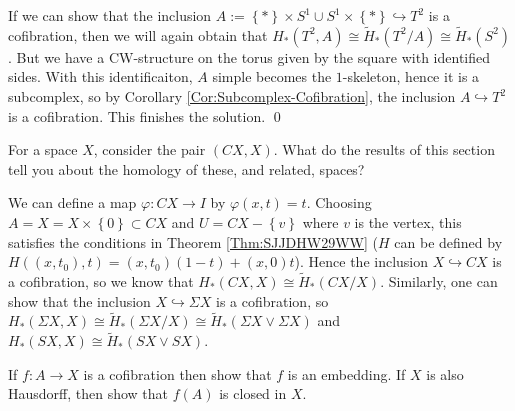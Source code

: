 \begin{solution}
    If we can show that the inclusion
    $A:= \left\{ * \right\} \times S^{1} \cup 
    S^{1} \times \left\{ * \right\} \hookrightarrow
    T^2$ is a cofibration, then
    we will again obtain that
    $H_* (T^2, A) \cong
    \tilde{H}_* \left( T^2 / A \right) \cong
    \tilde{H}_* \left( S^2 \right) $.
    But we have a CW-structure on the
    torus given by the square with identified sides.
    With this identificaiton, $A$ simple becomes
    the $1$-skeleton, hence it is a subcomplex, so
    by Corollary \ref{Cor:Subcomplex-Cofibration}, 
    the inclusion $A \hookrightarrow T^2$ is a cofibration.
    This finishes the solution. \qed
\end{solution}

\begin{problem}[]
    For a space $X$, consider the pair
    $\left( CX, X \right) $. What do the results of this
    section tell you about the homology of these, and related,
    spaces?
\end{problem}


\begin{solution}
    We can define a map
    $\varphi \colon CX \to I$ by
    $\varphi (x,t) = t$. Choosing
    $A = X = X \times \left\{ 0 \right\} \subset 
    CX$ and
    $U = CX - \left\{ v \right\} $ where
    $v$ is the vertex, this satisfies the
    conditions in Theorem \ref{Thm:SJJDHW29WW} 
    ($H$ can be defined by
    $H((x,t_0),t) = \left( x,t_0 \right) (1-t)
    + (x,0) t$).
    Hence the inclusion
    $X \hookrightarrow CX$ is a cofibration, so we
    know that
    $H_* \left( CX, X \right) 
    \cong \tilde{H}_* \left( CX / X \right) $.
    Similarly, one can
    show that the inclusion
    $X \hookrightarrow \Sigma X$ is a cofibration, so
    $H_* \left( \Sigma X , X \right) 
    \cong \tilde{H}_* \left( \Sigma X / X \right) 
    \cong \tilde{H}_* \left( 
    \Sigma X \vee \Sigma X \right) $ and
    $H_*\left( SX, X \right) 
    \cong \tilde{H}_* \left( SX \vee SX \right) $.
\end{solution}


\begin{problem}[]
    If $f \colon A \to X$ is a cofibration then show that
    $f$ is an embedding. If $X$ is also Hausdorff,
    then show that $f(A)$ is closed in $X$.
\end{problem}

